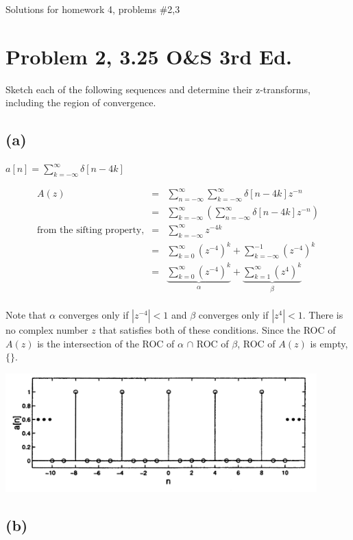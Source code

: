 \documentclass[11pt]{article}
\begin{document}
Solutions for homework 4, problems \#2,3

\section*{Problem 2, 3.25 O\&S 3rd Ed.}

Sketch each of the following sequences and determine their z-transforms, including the region of convergence.

\subsection*{(a)}

$a[n] = \sum\limits_{k=-\infty}^\infty \delta[n-4k]$

\begin{eqnarray*}
A(z) &=& \sum_{n=-\infty}^\infty \sum\limits_{k=-\infty}^\infty \delta[n-4k] z^{-n} \\
&=& \sum\limits_{k=-\infty}^\infty \left(\sum_{n=-\infty}^\infty  \delta[n-4k] z^{-n}\right) \\
\text{from the sifting property,} &=& \sum\limits_{k=-\infty}^\infty z^{-4k} \\
&=& \sum\limits_{k=0}^\infty (z^{-4})^k + \sum\limits_{k=-\infty}^{-1} (z^{-4})^k \\
&=& \underbrace{\sum\limits_{k=0}^\infty (z^{-4})^k}_\alpha + \underbrace{\sum\limits_{k=1}^{\infty} (z^{4})^k}_\beta \\
\end{eqnarray*}

Note that $\alpha$ converges only if $|z^{-4}|<1$ and $\beta$ converges only if $|z^4|<1$. There is no complex number $z$ that satisfies both of these conditions. Since the ROC of $A(z)$ is the intersection of the ROC of $\alpha$ $\cap$ ROC of $\beta$, ROC of $A(z)$ is empty, $\{\}$.

\includegraphics[width=0.9\textwidth]{Soln4/p2a.png} 

\subsection*{(b)}
\end{document}
